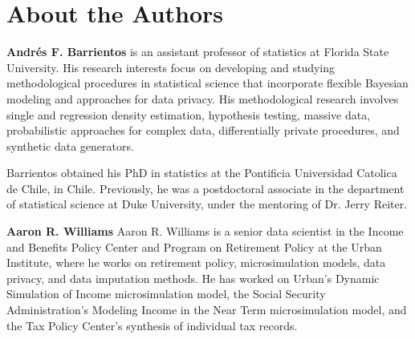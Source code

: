 \fancyfoot{}


\part{About the Authors}

\textbf{Andr\'es F. Barrientos} is an assistant professor of statistics at Florida State University. His research interests focus on developing and studying methodological procedures in statistical science that incorporate flexible Bayesian modeling and approaches for data privacy. His methodological research involves single and regression density estimation, hypothesis testing, massive data, probabilistic approaches for complex data, differentially private procedures, and synthetic data generators.

Barrientos obtained his PhD in statistics at the Pontificia Universidad Catolica de Chile, in Chile. Previously, he was a postdoctoral associate in the department of statistical science at Duke University, under the mentoring of Dr. Jerry Reiter. 

\noindent\textbf{Aaron R. Williams} Aaron R. Williams is a senior data scientist in the Income and Benefits Policy Center and Program on Retirement Policy at the Urban Institute, where he works on retirement policy, microsimulation models, data privacy, and data imputation methods. He has worked on Urban’s Dynamic Simulation of Income microsimulation model, the Social Security Administration’s Modeling Income in the Near Term microsimulation model, and the Tax Policy Center’s synthesis of individual tax records.

